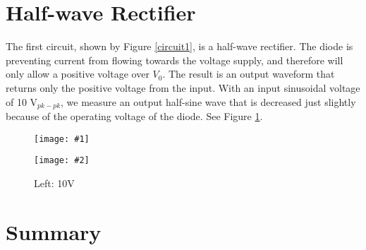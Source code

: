 \documentclass{article}
\newcommand{\twopics}[4]{
\begin{figure}
\begin{center}
  \begin{minipage}{.45\textwidth}
    \texttt{[image: \#1]}
  \end{minipage}
  \begin{minipage}{.45\textwidth}
    \texttt{[image: \#2]}
  \end{minipage}
  \label{#3}
  \caption{#4}
\end{center}
\end{figure}
}
\begin{document}
\section{Half-wave Rectifier}
The first circuit, shown by Figure \ref{circuit1}, is 
a half-wave rectifier. The diode is preventing current
from flowing towards the voltage supply, and therefore
will only allow a positive voltage over $V_0$. The result
is an output waveform that returns only the positive
voltage from the input. With an input sinusoidal voltage 
of 10 V$_{pk-pk}$, we measure an output half-sine wave
that is decreased just slightly because of the operating
voltage of the diode. See Figure \ref{output1}.

\twopics{scope/Circuit1-0.5V-max1}{scope/Circuit1-10V-max1}{output1}{Left: 10V}



\section{Summary}
\end{document}
